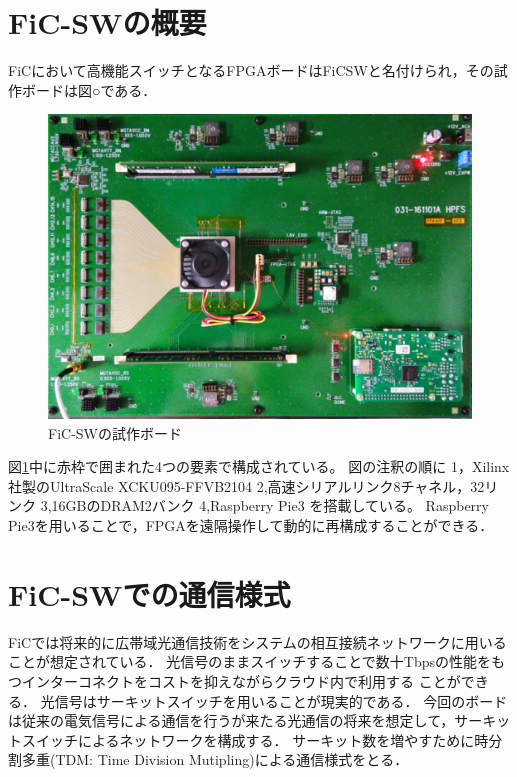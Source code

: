 {\section{FiC-SWの概要}
\label{sec:about_ficsw}
FiCにおいて高機能スイッチとなるFPGAボードはFiCSWと名付けられ，その試作ボードは図○である．
\begin{figure}[h]
  \centering
  \includegraphics[width=12cm]{./chap3/fig/ficsw.pdf}
  \caption{FiC-SWの試作ボード}
  \label{fig:ficsw}
\end{figure}
図\ref{fig:ficsw}中に赤枠で囲まれた4つの要素で構成されている。
図の注釈の順に
1，Xilinx社製のUltraScale XCKU095-FFVB2104
2,高速シリアルリンク8チャネル，32リンク
3,16GBのDRAM2バンク
4,Raspberry Pie3
を搭載している。
Raspberry Pie3を用いることで，FPGAを遠隔操作して動的に再構成することができる．
\section{FiC-SWでの通信様式}
\label{sec:ficsw_communication}
FiCでは将来的に広帯域光通信技術をシステムの相互接続ネットワークに用いることが想定されている．
光信号のままスイッチすることで数十Tbpsの性能をもつインターコネクトをコストを抑えながらクラウド内で利用する
ことができる．
光信号はサーキットスイッチを用いることが現実的である．
今回のボードは従来の電気信号による通信を行うが来たる光通信の将来を想定して，サーキットスイッチによるネットワークを構成する．
サーキット数を増やすために時分割多重(TDM: Time Division Mutipling)による通信様式をとる．

}
